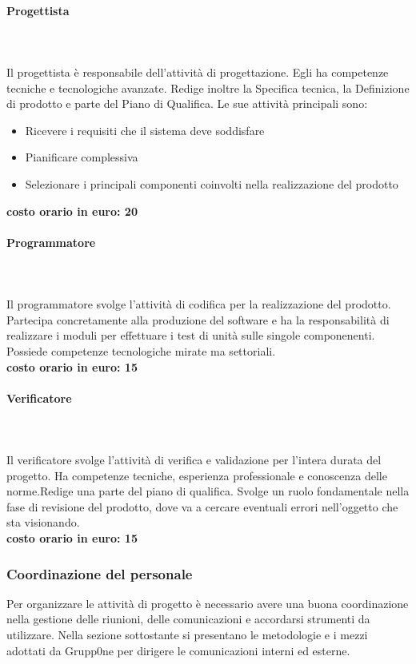 \documentclass[../norme-di-progetto.tex]{subfiles}
\begin{document}
\paragraph{Progettista}\mbox{}\\
\label{par:progettista}
\\Il progettista è responsabile dell'attività di progettazione. Egli ha competenze tecniche e tecnologiche avanzate. Redige inoltre la Specifica tecnica, la Definizione di prodotto e parte del Piano di Qualifica. Le sue attività principali sono:
\begin{itemize}
	\item Ricevere i requisiti che il sistema deve soddisfare
	\item Pianificare  complessiva
	\item Selezionare i principali componenti coinvolti nella realizzazione del prodotto
\end{itemize}
\textbf{costo orario in euro: 20}
\paragraph{Programmatore}\mbox{}\\
\label{par:programmatore}
\\Il programmatore svolge l'attività di codifica per la realizzazione del prodotto. Partecipa concretamente alla produzione del software e ha la responsabilità di realizzare i moduli per effettuare i test di unità sulle singole componenenti. Possiede competenze tecnologiche mirate ma settoriali.
\\\newline\textbf{costo orario in euro: 15}
\paragraph{Verificatore}\mbox{}\\
\label{par:verificatore}
\\Il verificatore svolge l'attività di verifica e validazione per l'intera durata del progetto. Ha competenze tecniche, esperienza professionale e conoscenza delle norme.Redige una parte del piano di qualifica. Svolge un ruolo fondamentale nella fase di revisione del prodotto, dove va a cercare eventuali errori nell'oggetto che sta visionando.
\\\newline\textbf{costo orario in euro: 15}
\subsubsection{Coordinazione del personale}
\label{subs:coordinazione del personale}
Per organizzare le attività di progetto è necessario avere una buona coordinazione nella gestione delle riunioni, delle comunicazioni e accordarsi strumenti da utilizzare. Nella sezione sottostante si presentano le metodologie e i mezzi adottati da Grupp0ne per dirigere le comunicazioni interni ed esterne.
\end{document}

